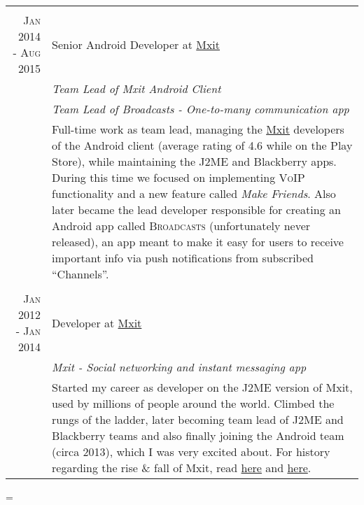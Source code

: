 \documentclass[a4paper,10pt,notitlepage]{article}
\newenvironment{absolutelynopagebreak}
  {\par\nobreak\vfil\penalty0\vfilneg
   \vtop\bgroup}
  {\par\xdef\tpd{\the\prevdepth}\egroup
   \prevdepth=\tpd}
\begin{document}
\begin{absolutelynopagebreak}
\begin{tabular}{r|p{11cm}}
		\multicolumn{2}{c}{} \\
		\textsc{Jan 2014 - Aug 2015} & Senior Android Developer at \href{www.mxit.com}{Mxit} \\
		                             & \emph{Team Lead of Mxit Android Client} \\
		                             & \emph{Team Lead of Broadcasts - One-to-many communication app} \\
		                             & \footnotesize{Full-time work as team lead, managing the \href{https://en.wikipedia.org/wiki/Mxit}{Mxit} developers of the Android client (average rating of 4.6 while on the Play Store), while maintaining the J2ME and Blackberry apps. During this time we focused on implementing \textsc{VoIP} functionality and a new feature called \textit{Make Friends}. Also later became the lead developer responsible for creating an Android app called \textsc{Broadcasts} (unfortunately never released), an app meant to make it easy for users to receive important info via push notifications from subscribed ``Channels''.} \\
		 
		\multicolumn{2}{c}{} \\
		\textsc{Jan 2012 - Jan 2014} & Developer at \href{www.mxit.com}{Mxit} \\
		                             & \emph{Mxit - Social networking and instant messaging app} \\
		                             & \footnotesize{Started my career as developer on the J2ME version of Mxit, used by millions of people around the world. Climbed the rungs of the ladder, later becoming team lead of J2ME and Blackberry teams and also finally joining the Android team (circa 2013), which I was very excited about. For history regarding the rise \& fall of Mxit, read \href{https://en.wikipedia.org/wiki/Mxit}{here} and \href{https://www.moneyweb.co.za/news/companies-and-deals/how-did-mxit-go-so-wrong/}{here}.} \\
		
	\end{tabular}
	
\end{absolutelynopagebreak}
\end{document}
